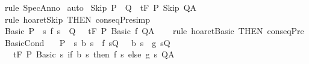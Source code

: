 \begin{isabellebody}
%
\isadelimproof
%
\endisadelimproof
%
\isatagproof
{}\isamarkupfalse%
\ {\isacharparenleft}rule\ SpecAnno{\isacharprime}{\isacharparenright}\isanewline
{}\isamarkupfalse%
\ auto\isanewline
{}\isamarkupfalse%
%
\endisatagproof
{\isafoldproof}%
%
\isadelimproof
\isanewline
%
\endisadelimproof
\isanewline
{}\isamarkupfalse%
\ Skip{\isacharcolon}\ {\isachardoublequoteopen}P\ {\isasymsubseteq}\ Q\ {\isasymLongrightarrow}\ {\isasymGamma}{\isacharcomma}{\isasymTheta}{\isasymturnstile}\isactrlsub t\isactrlbsub {\isacharslash}F\isactrlesub \ P\ Skip\ Q{\isacharcomma}A{\isachardoublequoteclose}\isanewline
%
\isadelimproof
\ \ %
\endisadelimproof
%
\isatagproof
{}\isamarkupfalse%
\ {\isacharparenleft}rule\ hoaret{\isachardot}Skip\ {\isacharbrackleft}THEN\ conseqPre{\isacharbrackright}{\isacharcomma}simp{\isacharparenright}%
\endisatagproof
{\isafoldproof}%
%
\isadelimproof
\isanewline
%
\endisadelimproof
\isanewline
{}\isamarkupfalse%
\ Basic{\isacharcolon}\ {\isachardoublequoteopen}P\ {\isasymsubseteq}\ {\isacharbraceleft}s{\isachardot}\ {\isacharparenleft}f\ s{\isacharparenright}\ {\isasymin}\ Q{\isacharbraceright}\ {\isasymLongrightarrow}\ \ {\isasymGamma}{\isacharcomma}{\isasymTheta}{\isasymturnstile}\isactrlsub t\isactrlbsub {\isacharslash}F\isactrlesub \ P\ {\isacharparenleft}Basic\ f{\isacharparenright}\ Q{\isacharcomma}A{\isachardoublequoteclose}\isanewline
%
\isadelimproof
\ \ %
\endisadelimproof
%
\isatagproof
{}\isamarkupfalse%
\ {\isacharparenleft}rule\ hoaret{\isachardot}Basic\ {\isacharbrackleft}THEN\ conseqPre{\isacharbrackright}{\isacharparenright}%
\endisatagproof
{\isafoldproof}%
%
\isadelimproof
\isanewline
%
\endisadelimproof
\isanewline
{}\isamarkupfalse%
\ BasicCond{\isacharcolon}\ \isanewline
\ \ {\isachardoublequoteopen}{\isasymlbrakk}P\ {\isasymsubseteq}\ {\isacharbraceleft}s{\isachardot}\ {\isacharparenleft}b\ s\ {\isasymlongrightarrow}\ f\ s{\isasymin}Q{\isacharparenright}\ {\isasymand}\ {\isacharparenleft}{\isasymnot}\ b\ s\ {\isasymlongrightarrow}\ g\ s{\isasymin}Q{\isacharparenright}{\isacharbraceright}{\isasymrbrakk}\ {\isasymLongrightarrow}\isanewline
\ \ \ {\isasymGamma}{\isacharcomma}{\isasymTheta}{\isasymturnstile}\isactrlsub t\isactrlbsub {\isacharslash}F\isactrlesub \ P\ Basic\ {\isacharparenleft}{\isasymlambda}s{\isachardot}\ if\ b\ s\ then\ f\ s\ else\ g\ s{\isacharparenright}\ Q{\isacharcomma}A{\isachardoublequoteclose}\isanewline
%
\isadelimproof
\ \ %
\endisadelimproof
%
\isatagproof
{}\isamarkupfalse%

\end{isabellebody}
